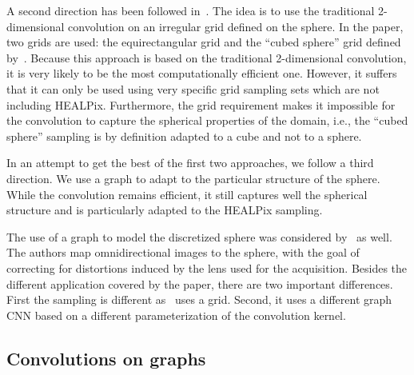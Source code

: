 \documentclass[final,twocolumn,3p,times,authoryear]{elsarticle}
\newcommand{\nati}[1]{{\color[rgb]{.1,.6,.1}{#1}}}
\newcommand{\todo}[1]{{\color[rgb]{.6,.1,.6}{#1}}}
\newcommand{\1}{\b{1}}              %
\newcommand{\0}{\b{0}}              %
\begin{document}
A second direction has been followed in~\citet{boomsma2017spherical}. The idea is
to use the traditional 2-dimensional convolution on an irregular grid defined on the
sphere. In the paper, two grids are used: the equirectangular grid and the ``cubed
sphere'' grid defined by~\citet{ronchi1996cubed}. \nati{Do we need a plot of the equirectangular and cubed sphere sampling?} Because this
approach is based on the traditional 2-dimensional convolution, it is very likely to be the
most computationally efficient one. However, it suffers that it can only be used using very
specific grid sampling sets which are not including HEALPix. Furthermore, the
grid requirement makes it impossible for the convolution to capture the
spherical properties of the domain, i.e., the ``cubed sphere'' sampling is by
definition adapted to a cube and not to a sphere.
\todo{border effects? \nati{@mdeff what are you thinking about here?}}

In an attempt to get the best of the first two approaches, we follow a third
direction. We use a graph to adapt to the particular structure of the sphere.
While the convolution remains efficient, it still captures well the spherical
structure and is particularly adapted to the HEALPix sampling.

The use of a graph to model the discretized sphere was considered by~\citet{khasanova2017graph} as well. The authors map omnidirectional images to the sphere, with the goal of correcting for distortions induced by the lens used for the acquisition.
Besides the different application covered by the paper, there are two important
differences. First the sampling is different as~\cite{khasanova2017graph} uses a
grid. Second, it uses a different graph CNN based on a different parameterization
of the convolution kernel.


\subsection{Convolutions on graphs}
\todo{Maybe we just describe convolutions on sphere and graph, i.e.: do we really need all these three subsections? Maybe simply merge them?}

\nati{I think that citing Bruna is to much... According to me, the goal of this subsection should not be to cite everything that exist. But should focus on
1) be fair and say that they are other graph convolutions that can be used, 2) show some connections between graph CNNs ang group equivariant CNNs (Done), and 3) suggest that they are possible extensions of what we do.}
\end{document}
